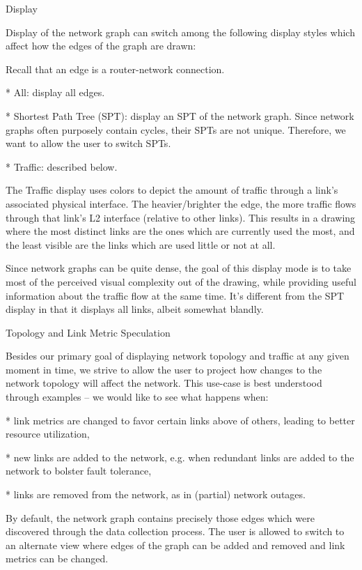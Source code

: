 \enditems

\secc Display

Display of the network graph can switch among the following display styles which
affect how the edges of the graph are drawn:

Recall that an edge is a router-network connection.

\begitems

* All: display all edges.

* Shortest Path Tree (SPT): display an SPT of the network graph. Since network
graphs often purposely contain cycles, their SPTs are not unique. Therefore, we
want to allow the user to switch SPTs.

* Traffic: described below.

\enditems

The Traffic display uses colors to depict the amount of traffic through a
link's associated physical interface. The heavier/brighter the edge, the more
traffic flows through that link's L2 interface (relative to other links). This
results in a drawing where the most distinct links are the ones which are
currently used the most, and the least visible are the links which are used
little or not at all.

Since network graphs can be quite dense, the goal of this display mode is to
take most of the perceived visual complexity out of the drawing, while
providing useful information about the traffic flow at the same time. It's
different from the SPT display in that it displays all links, albeit somewhat
blandly.

\secc Topology and Link Metric Speculation

Besides our primary goal of displaying network topology and traffic at any
given moment in time, we strive to allow the user to project how changes to the
network topology will affect the network. This use-case is best understood
through examples -- we would like to see what happens when:

\begitems

* link metrics are changed to favor certain links above of others, leading to
better resource utilization,

* new links are added to the network, e.g. when redundant links are added to the
network to bolster fault tolerance,

* links are removed from the network, as in (partial) network outages.

\enditems

By default, the network graph contains precisely those edges which were
discovered through the data collection process. The user is allowed to switch to
an alternate view where edges of the graph can be added and removed and link
metrics can be changed.

